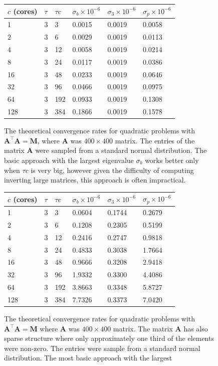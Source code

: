 \documentclass[11pt]{article}
\newcommand{\bA}{\mathbf{A}}
\begin{document}
	\begin{figure}
		\centering
		\begin{tabular}{ | l | l | l | p{1cm} |  p{1cm} |p{1cm} |}
			\hline
			$c$ (cores) & $\tau$ & $\tau c$ & $\sigma_b \times 10^{-6}$ & $\sigma_3 \times 10^{-6}$ & $\sigma_p \times 10^{-6}$ \\ \hline 
			1 & 3 & 3 & 0.0015 & 0.0019 & 0.0058 \\  \hline
			2 & 3 & 6 & 0.0029 & 0.0019 & 0.0113\\ \hline
			4 & 3 & 12 & 0.0058 & 0.0019 & 0.0214\\  \hline
			8 & 3 & 24 & 0.0117 & 0.0019 & 0.0386\\  \hline
			16 & 3 & 48 & 0.0233 & 0.0019 & 0.0646\\  \hline
			32 & 3 & 96 & 0.0466 & 0.0019 & 0.0975\\  \hline
			64 & 3 & 192 & 0.0933 & 0.0019 & 0.1308\\  \hline
			128 & 3 & 384 & 0.1866 & 0.0019 & 0.1578\\  \hline
		\end{tabular}
		\caption{The theoretical convergence rates for quadratic problems with $\mathbf{A}^\top \mathbf{A} = \mathbf{M}$, where $\mathbf{A}$ was $400 \times 400$ matrix. The entries of the matrix $\bA$ were sampled from a standard normal distribution. The basic approach with the largest eigenvalue $\sigma_b$ works better only when $\tau c$ is very big, however given the difficulty of computing inverting large matrices, this approach is often impractical.}
		\label{tbl:tbl1}
	\end{figure}
	
	\begin{figure}
		\centering
		\begin{tabular}{ | l | l | l | p{1cm} |  p{1cm} |p{1cm} |}
			\hline
			$c$ (cores) & $\tau$ & $\tau c$ & $\sigma_b \times 10^{-6}$ & $\sigma_3 \times 10^{-6}$ & $\sigma_p \times 10^{-6}$ \\ \hline
			1 & 3 & 3 & 0.0604 & 0.1744 & 0.2679 \\ \hline
			2 & 3 & 6 & 0.1208 & 0.2305 & 0.5199\\ \hline
			4 & 3 & 12 & 0.2416 & 0.2747 & 0.9818\\ \hline
			8 & 3 & 24 & 0.4833 & 0.3038 & 1.7664\\ \hline
			16 & 3 & 48 & 0.9666 & 0.3208 & 2.9418\\ \hline
			32 & 3 & 96 & 1.9332 & 0.3300 & 4.4086\\ \hline
			64 & 3 & 192 & 3.8663 & 0.3348 & 5.8727\\ \hline
			128 & 3 & 384 & 7.7326 & 0.3373 & 7.0420\\ \hline
		\end{tabular}
		\caption{The theoretical convergence rates for quadratic problems with  $\mathbf{A}^\top \mathbf{A} = \mathbf{M}$ where $\mathbf{A}$ was $400\times400$ matrix. The matrix $\mathbf{A}$ has also sparse structure where only approximately one third of the elements were non-zero. The entries were sample from a standard normal distribution. The most basic approach with the largest}
		\label{tbl:tbl2}
	\end{figure}
	
\end{document}
